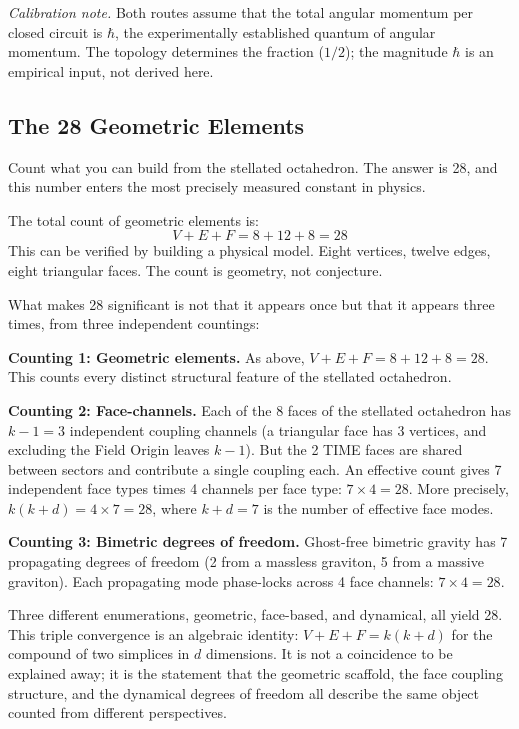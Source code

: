 \documentclass[aps,prd,preprint,superscriptaddress,showpacs,preprintnumbers,amsmath,amssymb,nofootinbib]{revtex4-2}
\begin{document}
\noindent\textit{Calibration note.} Both routes assume that the total angular momentum per closed circuit is $\hbar$, the experimentally established quantum of angular momentum. The topology determines the fraction ($1/2$); the magnitude $\hbar$ is an empirical input, not derived here.

\subsection{The 28 Geometric Elements}
\label{subsec:elements}

Count what you can build from the stellated octahedron. The answer is 28, and this number enters the most precisely measured constant in physics.

The total count of geometric elements is:
\begin{equation}
V + E + F = 8 + 12 + 8 = 28
\label{eq:28-elements}
\end{equation}
This can be verified by building a physical model. Eight vertices, twelve edges, eight triangular faces. The count is geometry, not conjecture.

What makes 28 significant is not that it appears once but that it appears three times, from three independent countings:

\textbf{Counting 1: Geometric elements.} As above, $V + E + F = 8 + 12 + 8 = 28$. This counts every distinct structural feature of the stellated octahedron.

\textbf{Counting 2: Face-channels.} Each of the 8 faces of the stellated octahedron has $k - 1 = 3$ independent coupling channels (a triangular face has 3 vertices, and excluding the Field Origin leaves $k - 1$). But the 2 TIME faces are shared between sectors and contribute a single coupling each. An effective count gives 7 independent face types times 4 channels per face type: $7 \times 4 = 28$. More precisely, $k(k+d) = 4 \times 7 = 28$, where $k + d = 7$ is the number of effective face modes.

\textbf{Counting 3: Bimetric degrees of freedom.} Ghost-free bimetric gravity has 7 propagating degrees of freedom (2 from a massless graviton, 5 from a massive graviton). Each propagating mode phase-locks across 4 face channels: $7 \times 4 = 28$.

Three different enumerations, geometric, face-based, and dynamical, all yield 28. This triple convergence is an algebraic identity: $V + E + F = k(k + d)$ for the compound of two simplices in $d$ dimensions. It is not a coincidence to be explained away; it is the statement that the geometric scaffold, the face coupling structure, and the dynamical degrees of freedom all describe the same object counted from different perspectives.
\end{document}
